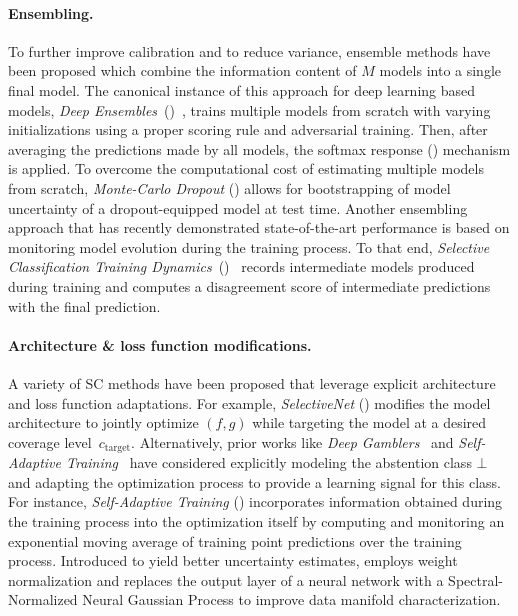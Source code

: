 \paragraph{Ensembling.} %
To further improve calibration and to reduce variance, ensemble methods have been proposed which combine the information content of $M$ models into a single final model. The canonical instance of this approach for deep learning based models, \emph{Deep Ensembles}~(\de)~\citep{lakshminarayanan2017simple}, trains multiple models from scratch with varying initializations using a proper scoring rule and adversarial training. Then, after averaging the predictions made by all models, the softmax response (\sr) mechanism is applied. To overcome the computational cost of estimating multiple models from scratch, \emph{Monte-Carlo Dropout} (\mcdo) \citep{gal2016dropout} allows for bootstrapping of model uncertainty of a dropout-equipped model at test time. Another ensembling approach that has recently demonstrated state-of-the-art \selc performance is based on monitoring model evolution during the training process. To that end, \emph{Selective Classification Training Dynamics}~(\sctd)~\citep{rabanser2022selective} records intermediate models produced during training and computes a disagreement score of intermediate predictions with the final prediction. 


\paragraph{Architecture \& loss function modifications.} 
A variety of SC methods have been proposed that leverage explicit architecture and loss function adaptations. %
For example, \emph{SelectiveNet} (\sn) \citep{geifman2019selectivenet} modifies the model architecture to jointly optimize $(f,g)$ while targeting the model at a desired coverage level~$c_\text{target}$. Alternatively, prior works like \emph{Deep Gamblers}~\citep{liu2019deep} and \emph{Self-Adaptive Training}~\citep{huang2020self} have considered explicitly modeling the abstention class $\bot$ and adapting the optimization process to provide a learning signal for this class. For instance, \emph{Self-Adaptive Training} (\sat) incorporates information obtained during the training process into the optimization itself by computing and monitoring an exponential moving average of training point predictions over the training process. Introduced to yield better uncertainty estimates, \citet{liu2020simple} employs weight normalization and replaces the output layer of a neural network with a Spectral-Normalized Neural Gaussian Process to improve data manifold characterization. 


